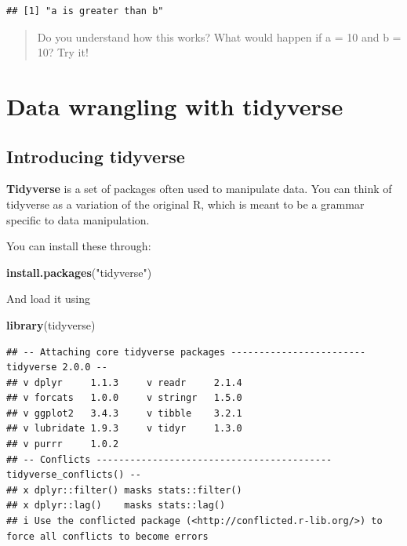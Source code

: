 \documentclass[
]{book}
\newenvironment{Shaded}{\begin{snugshade}}{\end{snugshade}}
\newcommand{\FunctionTok}[1]{\textcolor[rgb]{0.13,0.29,0.53}{\textbf{#1}}}
\newcommand{\NormalTok}[1]{#1}
\newcommand{\StringTok}[1]{\textcolor[rgb]{0.31,0.60,0.02}{#1}}
\begin{document}
\begin{verbatim}
## [1] "a is greater than b"
\end{verbatim}

\begin{quote}
Do you understand how this works?
What would happen if a = 10 and b = 10?
Try it!
\end{quote}

\hypertarget{data-wrangling-with-tidyverse}{%
\section*{Data wrangling with tidyverse}\label{data-wrangling-with-tidyverse}}

\hypertarget{introducing-tidyverse}{%
\subsection*{Introducing tidyverse}\label{introducing-tidyverse}}

\textbf{Tidyverse} is a set of packages often used to manipulate data.
You can think of tidyverse as a variation of the original R, which is meant to be a grammar specific to data manipulation.

You can install these through:

\begin{Shaded}
\begin{Highlighting}[]
\FunctionTok{install.packages}\NormalTok{(}\StringTok{"tidyverse"}\NormalTok{)}
\end{Highlighting}
\end{Shaded}

And load it using

\begin{Shaded}
\begin{Highlighting}[]
\FunctionTok{library}\NormalTok{(tidyverse)}
\end{Highlighting}
\end{Shaded}

\begin{verbatim}
## -- Attaching core tidyverse packages ------------------------ tidyverse 2.0.0 --
## v dplyr     1.1.3     v readr     2.1.4
## v forcats   1.0.0     v stringr   1.5.0
## v ggplot2   3.4.3     v tibble    3.2.1
## v lubridate 1.9.3     v tidyr     1.3.0
## v purrr     1.0.2     
## -- Conflicts ------------------------------------------ tidyverse_conflicts() --
## x dplyr::filter() masks stats::filter()
## x dplyr::lag()    masks stats::lag()
## i Use the conflicted package (<http://conflicted.r-lib.org/>) to force all conflicts to become errors
\end{verbatim}
\end{document}
